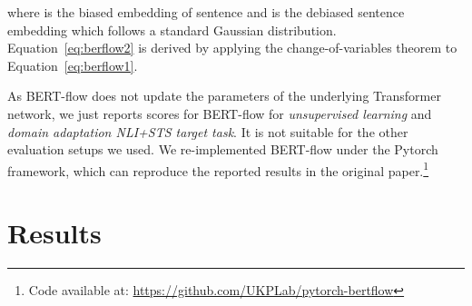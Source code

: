 \documentclass[11pt]{article}
\begin{document}
where  is the biased embedding of sentence  and  is the debiased sentence embedding which follows a standard Gaussian distribution. Equation~\ref{eq:berflow2} is derived by applying the change-of-variables theorem to Equation~\ref{eq:berflow1}.

As BERT-flow does not update the parameters of the underlying Transformer network, we just reports scores for BERT-flow for \textit{unsupervised learning} and \textit{domain adaptation NLI+STS  target task}. It is not suitable for the other evaluation setups we used. We re-implemented BERT-flow under the Pytorch framework, which can reproduce the reported results in the original paper.\footnote{Code available at: \url{https://github.com/UKPLab/pytorch-bertflow}}


\section{Results}
\label{sec:results}
\end{document}
